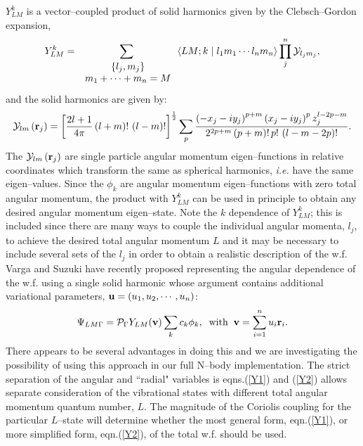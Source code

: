 {{$Y_{LM}^k$ is a vector--coupled product 
of solid harmonics\cite{Biedenharn81}
given by the Clebsch--Gordon expansion, 
\begin{equation}
Y_{LM}^k=\sum_{\,\,\begin{array}{c} {\left\{ l_j,m_j\right\} }
\\ {m_1+\cdots
+m_n=M} \end{array}
}\left\langle LM;k\right. |\left. l_1m_1\cdots l_nm_n\right\rangle
%
\prod_j^n{\cal Y}_{l_jm_j},
\end{equation}
and the solid harmonics are given by:
\begin{equation}
{\cal Y}_{lm}\left( {\bf r}_j\right) =\left[ \frac{2l+1}{4\pi }\left(
l+m\right) !\,\left( l-m\right) !\right] ^{\frac 12}\sum_p\frac{\left(
-x_j-iy_j\right) ^{p+m}\left( x_j-iy_j\right) ^pz_j^{l-2p-m}}{2^{2p+m}\left(
p+m\right) !\,p!\,\left( l-m-2p\right) !}.
\end{equation}
The ${\cal Y}_{lm}\left( {\bf r}_j\right) $ are single particle
angular momentum eigen--functions 
in relative coordinates which transform the
same as spherical harmonics, {\it i.e.} 
have the same eigen--values. Since
the $\phi _k$ are angular momentum 
eigen--functions with zero total angular
momentum, the product with $Y_{LM}^k$ 
can be used in principle to obtain any
desired angular momentum eigen--state. 
Note the $k$ dependence of $Y_{LM}^k$;
this is included since there are many 
ways to couple the individual angular
momenta, $l_j$, 
to achieve the desired total angular momentum $L$ and it may
be necessary to include several sets of the $l_j$ in order to obtain a
realistic description of the w.f. Varga and Suzuki\cite{Varga95}
have recently
proposed representing the angular dependence of the w.f. using
a single solid harmonic whose argument 
contains additional variational
parameters, ${\bf u} = (u_1, u_2, \cdots, u_n)$:
\begin{equation}
\Psi_{LM\Gamma } = {\cal P}_\Gamma Y_{LM}({\bf v}) \sum_k c_k \phi_k,
\; \; {\rm with} \; \; 
{\bf v} = \sum_{i=1}^{n} u_i {\bf r}_i.
\label{Y2}
\end{equation}
There appears to be several advantages in doing this and we are
investigating the possibility of using 
this approach in our full N--body
implementation.
The strict separation of the angular and ``radial" variables is
eqns.(\ref{Y1}) and (\ref{Y2}) allows separate consideration of
the vibrational states with different total angular momentum
quantum number, $L$. The magnitude of the Coriolis coupling
for the particular $L$--state will determine whether the most
general form, eqn.(\ref{Y1}), or more simplified form,
eqn.(\ref{Y2}), of the total w.f. should be used. 

}}

